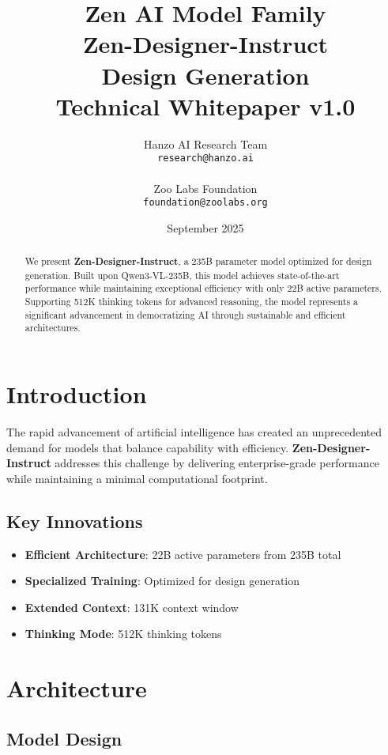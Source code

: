 \documentclass[11pt,a4paper]{article}
\title{
    \vspace{-2cm}
    \Large \textbf{Zen AI Model Family} \\
    \vspace{0.5cm}
    \Huge \textbf{Zen-Designer-Instruct} \\
    \vspace{0.3cm}
    \large Design Generation \\
    \vspace{0.5cm}
    \normalsize Technical Whitepaper v1.0
}
\author{
    Hanzo AI Research Team \\
    \texttt{research@hanzo.ai} \\
    \\
    Zoo Labs Foundation \\
    \texttt{foundation@zoolabs.org}
}
\date{September 2025}
\begin{document}
\maketitle

\begin{abstract}
We present \textbf{Zen-Designer-Instruct}, a 235B parameter model optimized for design generation. 
Built upon Qwen3-VL-235B, this model achieves state-of-the-art performance while maintaining exceptional efficiency 
with only 22B active parameters. Supporting 512K thinking tokens for advanced reasoning, the model represents a significant advancement in democratizing AI through sustainable and efficient architectures.
\end{abstract}

\tableofcontents
\newpage

\section{Introduction}

The rapid advancement of artificial intelligence has created an unprecedented demand for models that balance capability with efficiency. 
\textbf{Zen-Designer-Instruct} addresses this challenge by delivering enterprise-grade performance while maintaining a minimal computational footprint.

\subsection{Key Innovations}
\begin{itemize}
    \item \textbf{Efficient Architecture}: 22B active parameters from 235B total
    \item \textbf{Specialized Training}: Optimized for design generation
    \item \textbf{Extended Context}: 131K context window
    \item \textbf{Thinking Mode}: 512K thinking tokens
    
    
\end{itemize}

\section{Architecture}

\subsection{Model Design}
\end{document}
